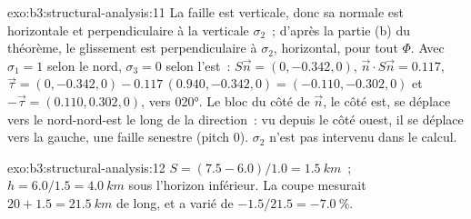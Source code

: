 \begin{solution}{exo:b3:structural-analysis:11}
La faille est verticale, donc sa normale est horizontale et perpendiculaire à la
verticale $\sigma_2$~; d'après la partie (b) du théorème, le glissement est perpendiculaire à
$\sigma_2$, horizontal, pour tout $\Phi$. Avec $\sigma_1 = 1$ selon le nord,
$\sigma_3 = 0$ selon l'est~: $S\vec n = (0, -0.342, 0)$, $\vec n\cdot S\vec n =
0.117$, $\vec\tau = (0, -0.342, 0) - 0.117\,(0.940, -0.342, 0) = (-0.110,
-0.302, 0)$ et $-\vec\tau = (0.110, 0.302, 0)$, vers \ang{020}. Le bloc
du côté de $\vec n$, le côté est, se déplace vers le nord-nord-est le long de la
direction~: vu depuis le côté ouest, il se déplace vers la gauche, une faille senestre (pitch
0). $\sigma_2$ n'est pas intervenu dans le calcul.
\end{solution}

\begin{solution}{exo:b3:structural-analysis:12}
$S = (7.5 - 6.0)/1.0 = \qty{1.5}{km}$~; $h = 6.0/1.5 = \qty{4.0}{km}$ sous
l'horizon inférieur. La coupe mesurait $20 + 1.5 = \qty{21.5}{km}$ de long, et a varié
de $-1.5/21.5 = \qty{-7.0}{\percent}$.
\end{solution}

